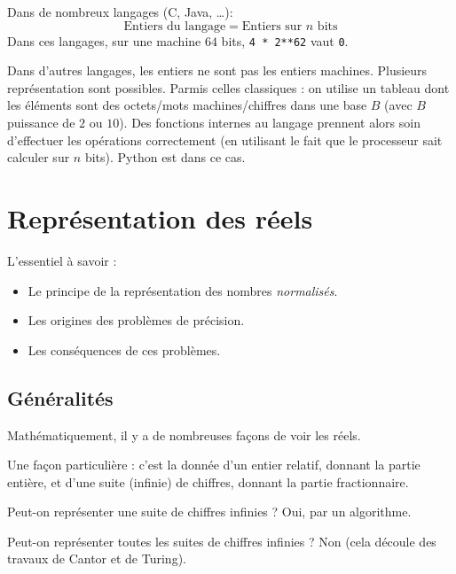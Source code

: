 Dans de nombreux langages (C, Java, \ldots):
\begin{equation*}
  \text{Entiers du langage} = \text{Entiers sur $n$ bits}
\end{equation*}
Dans ces langages, sur une machine $64$ bits,
\texttt{4 * 2**62} vaut \texttt{0}.

Dans d'autres langages, les entiers ne sont pas les entiers machines. Plusieurs
  représentation sont possibles. Parmis celles classiques : on utilise un tableau dont les
  éléments sont des octets/mots machines/chiffres dans une base $B$  (avec $B$ puissance de $2$ ou $10$).
 Des fonctions internes  au langage prennent alors soin d'effectuer les
  opérations correctement (en utilisant le fait que le processeur sait
  calculer sur $n$ bits). Python est dans ce cas.

\section{Représentation des réels}

L'essentiel à savoir :
\begin{itemize}
\item[\textbullet] Le principe de la représentation des nombres \emph{normalisés}.
\item[\textbullet] Les origines des problèmes de précision.
\item[\textbullet] Les conséquences de ces problèmes.
\end{itemize}
\subsection{Généralités}
Mathématiquement, il y a de nombreuses façons de voir les réels.

Une façon particulière : c'est la donnée d'un entier relatif, donnant la partie entière, et d'une
suite (infinie) de chiffres, donnant la partie fractionnaire.

Peut-on représenter une suite de chiffres infinies ? Oui, par un algorithme.

Peut-on représenter toutes les suites de chiffres infinies ? Non (cela découle des travaux de Cantor et de  Turing).


